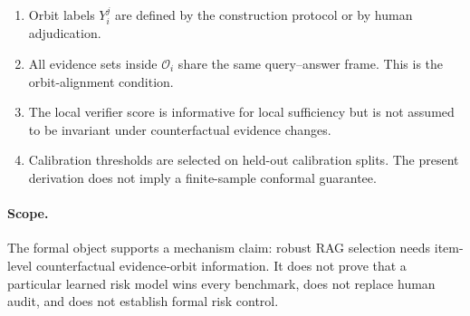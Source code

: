 \begin{enumerate}
  \item Orbit labels $Y_i^j$ are defined by the construction protocol or by
  human adjudication.
  \item All evidence sets inside $\mathcal{O}_i$ share the same query--answer
  frame.  This is the orbit-alignment condition.
  \item The local verifier score is informative for local sufficiency but is not
  assumed to be invariant under counterfactual evidence changes.
  \item Calibration thresholds are selected on held-out calibration splits.  The
  present derivation does not imply a finite-sample conformal guarantee.
\end{enumerate}

\paragraph{Scope.}
The formal object supports a mechanism claim: robust RAG selection needs
item-level counterfactual evidence-orbit information.  It does not prove that a
particular learned risk model wins every benchmark, does not replace human
audit, and does not establish formal risk control.
